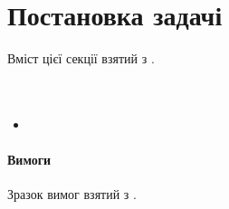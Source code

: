 \nocite{*}
\sffamily

\section{Постановка задачі}
Вміст цієї секції взятий з \cite{CSHPiskunov}.\\
 \\
 \\
\begin{itemize}
	\item
\end{itemize}

\paragraph{Вимоги}
Зразок вимог взятий з \cite{kulikov}. 
